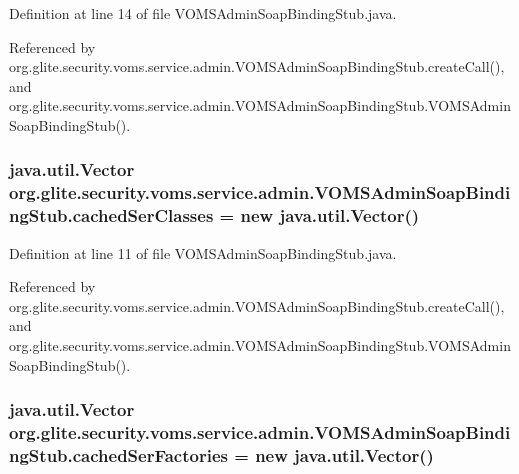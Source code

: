 Definition at line 14 of file VOMSAdminSoapBindingStub.java.



Referenced by org.glite.security.voms.service.admin.VOMSAdminSoapBindingStub.createCall(), and org.glite.security.voms.service.admin.VOMSAdminSoapBindingStub.VOMSAdminSoapBindingStub().

\hypertarget{classorg_1_1glite_1_1security_1_1voms_1_1service_1_1admin_1_1VOMSAdminSoapBindingStub_a8eb8874b8171e8c2e9b81b0072cd41a9}{
\subsubsection[{cachedSerClasses}]{\setlength{\rightskip}{0pt plus 5cm}java.util.Vector {\bf org.glite.security.voms.service.admin.VOMSAdminSoapBindingStub.cachedSerClasses} = new java.util.Vector()}}
\label{classorg_1_1glite_1_1security_1_1voms_1_1service_1_1admin_1_1VOMSAdminSoapBindingStub_a8eb8874b8171e8c2e9b81b0072cd41a9}


Definition at line 11 of file VOMSAdminSoapBindingStub.java.



Referenced by org.glite.security.voms.service.admin.VOMSAdminSoapBindingStub.createCall(), and org.glite.security.voms.service.admin.VOMSAdminSoapBindingStub.VOMSAdminSoapBindingStub().

\hypertarget{classorg_1_1glite_1_1security_1_1voms_1_1service_1_1admin_1_1VOMSAdminSoapBindingStub_aa3d0a4136ef487e2af904ef5b7ffafb6}{
\subsubsection[{cachedSerFactories}]{\setlength{\rightskip}{0pt plus 5cm}java.util.Vector {\bf org.glite.security.voms.service.admin.VOMSAdminSoapBindingStub.cachedSerFactories} = new java.util.Vector()}}
\label{classorg_1_1glite_1_1security_1_1voms_1_1service_1_1admin_1_1VOMSAdminSoapBindingStub_aa3d0a4136ef487e2af904ef5b7ffafb6}


